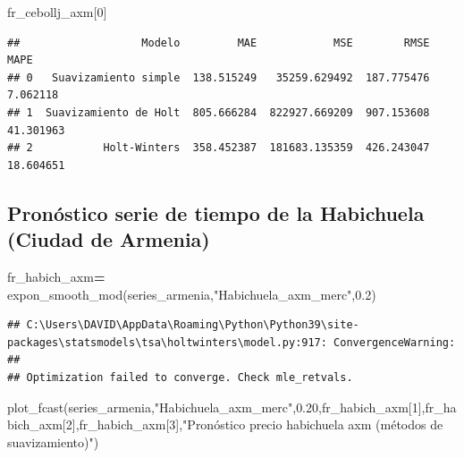 \documentclass[
]{book}
\newenvironment{Shaded}{\begin{snugshade}}{\end{snugshade}}
\newcommand{\DecValTok}[1]{\textcolor[rgb]{0.00,0.00,0.81}{#1}}
\newcommand{\FloatTok}[1]{\textcolor[rgb]{0.00,0.00,0.81}{#1}}
\newcommand{\NormalTok}[1]{#1}
\newcommand{\OperatorTok}[1]{\textcolor[rgb]{0.81,0.36,0.00}{\textbf{#1}}}
\newcommand{\StringTok}[1]{\textcolor[rgb]{0.31,0.60,0.02}{#1}}
\begin{document}
\begin{Shaded}
\begin{Highlighting}[]

\NormalTok{fr\_cebollj\_axm[}\DecValTok{0}\NormalTok{]}
\end{Highlighting}
\end{Shaded}

\begin{verbatim}
##                   Modelo         MAE            MSE        RMSE       MAPE
## 0   Suavizamiento simple  138.515249   35259.629492  187.775476   7.062118
## 1  Suavizamiento de Holt  805.666284  822927.669209  907.153608  41.301963
## 2           Holt-Winters  358.452387  181683.135359  426.243047  18.604651
\end{verbatim}

\hypertarget{pronuxf3stico-serie-de-tiempo-de-la-habichuela-ciudad-de-armenia}{%
\subsection{Pronóstico serie de tiempo de la Habichuela (Ciudad de Armenia)}\label{pronuxf3stico-serie-de-tiempo-de-la-habichuela-ciudad-de-armenia}}

\begin{Shaded}
\begin{Highlighting}[]

\NormalTok{fr\_habich\_axm}\OperatorTok{=}\NormalTok{ expon\_smooth\_mod(series\_armenia,}\StringTok{"Habichuela\_axm\_merc"}\NormalTok{,}\FloatTok{0.2}\NormalTok{)}
\end{Highlighting}
\end{Shaded}

\begin{verbatim}
## C:\Users\DAVID\AppData\Roaming\Python\Python39\site-packages\statsmodels\tsa\holtwinters\model.py:917: ConvergenceWarning:
## 
## Optimization failed to converge. Check mle_retvals.
\end{verbatim}

\begin{Shaded}
\begin{Highlighting}[]
\NormalTok{plot\_fcast(series\_armenia,}\StringTok{"Habichuela\_axm\_merc"}\NormalTok{,}\FloatTok{0.20}\NormalTok{,fr\_habich\_axm[}\DecValTok{1}\NormalTok{],fr\_habich\_axm[}\DecValTok{2}\NormalTok{],fr\_habich\_axm[}\DecValTok{3}\NormalTok{],}\StringTok{"Pronóstico precio habichuela axm (métodos de suavizamiento)"}\NormalTok{)}
\end{Highlighting}
\end{Shaded}
\end{document}
